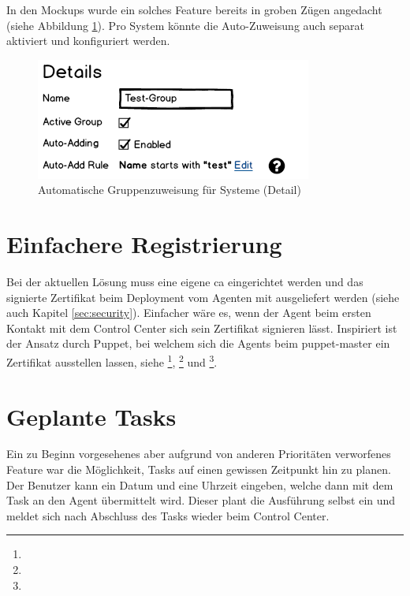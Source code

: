 In den Mockups wurde ein solches Feature bereits in groben Zügen angedacht (siehe Abbildung \ref{fig:ergebnis:group_systems_detail}). Pro System könnte die Auto-Zuweisung auch separat aktiviert und konfiguriert werden.

\begin{figure}
    \centering
    \includegraphics{files/mockups/group_systems_detail}
    \caption{Automatische Gruppenzuweisung für Systeme (Detail)}
    \label{fig:ergebnis:group_systems_detail}
\end{figure}

\section{Einfachere Registrierung} \label{sec:ausblick:simple_registration}

Bei der aktuellen Lösung muss eine eigene \gls{ca} eingerichtet werden und das signierte Zertifikat beim Deployment vom Agenten mit ausgeliefert werden (siehe auch Kapitel \ref{sec:security}). Einfacher wäre es, wenn der Agent beim ersten Kontakt mit dem Control Center sich sein Zertifikat signieren lässt. Inspiriert ist der Ansatz durch Puppet, bei welchem sich die Agents beim puppet-master ein Zertifikat ausstellen lassen, siehe \footnote{}, \footnote{} und \footnote{}.

\section{Geplante Tasks} \label{sec:ausblick:scheduled_tasks}

Ein zu Beginn vorgesehenes aber aufgrund von anderen Prioritäten verworfenes Feature war die Möglichkeit, Tasks auf einen gewissen Zeitpunkt hin zu planen. Der Benutzer kann ein Datum und eine Uhrzeit eingeben, welche dann mit dem Task an den Agent übermittelt wird. Dieser plant die Ausführung selbst ein und meldet sich nach Abschluss des Tasks wieder beim Control Center.

